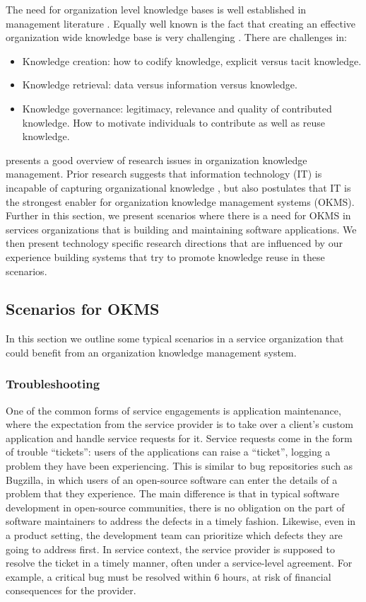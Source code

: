 The need for organization level knowledge bases is well established in management literature \cite{}. Equally well known is the fact that creating an effective organization wide knowledge base is very challenging \cite{}. There are challenges in:
\begin{itemize}
\item Knowledge creation: how to codify knowledge, explicit versus tacit knowledge.
\item Knowledge retrieval: data versus information versus knowledge.
\item Knowledge governance: legitimacy, relevance and quality of contributed knowledge. How to motivate individuals to contribute as well as reuse knowledge.
\end{itemize}

\cite{} presents a good overview of research issues in organization knowledge management. Prior research suggests that information technology (IT) is incapable of capturing organizational knowledge \cite{}, but also postulates that IT is the strongest enabler for organization knowledge management systems (OKMS). Further in this section, we present scenarios where there is a need for OKMS in services organizations that is building and maintaining software applications. We then present technology specific research directions that are influenced by our experience building systems that try to promote knowledge reuse in these scenarios. 

\subsection{Scenarios for OKMS}

In this section we outline some typical scenarios in a service organization that could benefit from an organization knowledge management system. 

\subsubsection{Troubleshooting}

One of the common forms of service engagements is application maintenance, where the expectation from the service provider is to take over a client's custom application and handle service requests for it.  Service requests come in the form of trouble ``tickets'': users of the applications can raise a ``ticket'', logging a problem they have been experiencing. This is similar to bug repositories such as Bugzilla, in which users of an open-source software can enter the details of a problem that they experience.  The main difference is that in typical software development in open-source communities, there is no obligation on the part of software maintainers to address the defects in a timely fashion. Likewise, even in a product setting, the development team can prioritize which defects they are going to address first.  In service context, the service provider is supposed to resolve the ticket in a timely manner, often under a service-level agreement. For example, a critical bug must be resolved within 6 hours, at risk of financial consequences for the provider. 

